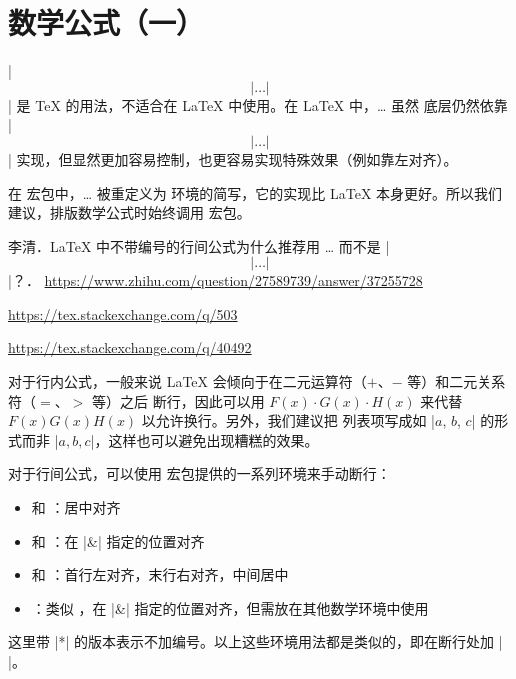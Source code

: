 
\let\fancybreak\relax

\section{数学公式（一）}
\label{sec:math-i}



|$$|\ldots|$$| 是 \TeX{} 的用法，不适合在 \LaTeX{} 中使用。在 \LaTeX{} 中，\cs{[}\ldots\cs{]} 虽然
底层仍然依靠 |$$|\ldots|$$| 实现，但显然更加容易控制，也更容易实现特殊效果（例如靠左对齐）。

在  宏包中，\cs{[}\ldots\cs{]} 被重定义为  环境的简写，它的实现比
\LaTeX{} 本身更好。所以我们建议，排版数学公式时始终调用  宏包。

\begin{reference}
  \item 李清．\LaTeX{} 中不带编号的行间公式为什么推荐用 \cs{[}\ldots\cs{]} 而不是 |$$|\ldots|$$|？．
    \url{https://www.zhihu.com/question/27589739/answer/37255728}
  \item \url{https://tex.stackexchange.com/q/503}
  \item \url{https://tex.stackexchange.com/q/40492}
\end{reference}



对于行内公式，一般来说 \LaTeX{} 会倾向于在二元运算符（$+$、$-$ 等）和二元关系符（$=$、$>$ 等）之后
断行，因此可以用 $F(x) \cdot G(x) \cdot H(x)$ 来代替 $F(x)G(x)H(x)$ 以允许换行。另外，我们建议把
列表项写成如 |$a$, $b$, $c$| 的形式而非 |$a, b, c$|，这样也可以避免出现糟糕的效果。

对于行间公式，可以使用  宏包提供的一系列环境来手动断行：
\begin{itemize}
  \item {} 和 ：居中对齐
  \item {} 和 ：在 |&| 指定的位置对齐
  \item {} 和 ：首行左对齐，末行右对齐，中间居中
  \item {}：类似 ，在 |&| 指定的位置对齐，但需放在其他数学环境中使用
\end{itemize}
这里带 |*| 的版本表示不加编号。以上这些环境用法都是类似的，即在断行处加 |\\|。


